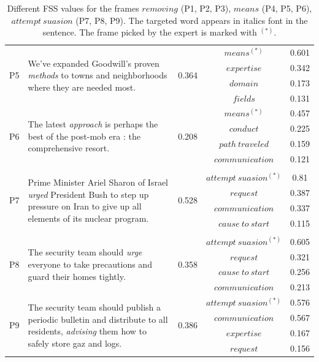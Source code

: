 \begin{table}[tb!]
{\begin{tabular}{cp{5.5cm}ccc}
\multirow{4}{*}{P5} & \multirow{4}{5.5cm}{We've expanded Goodwill's proven \textit{methods} to towns and neighborhoods where they are needed most.} & \multirow{4}{*}{0.364} & $means^{(*)}$ & 0.601 \\ %
& & & $expertise$ & 0.342 \\ %
& & & $domain$ & 0.173 \\ %
& & & $fields$ & 0.131 \\ \hline

\multirow{4}{*}{P6} & \multirow{4}{5.5cm}{The latest \textit{approach} is perhaps the best of the post-mob era : the comprehensive resort.} & \multirow{4}{*}{0.208} & $means^{(*)}$ & 0.457 \\ %
& & & $conduct$ & 0.225 \\ %
& & & $path\ traveled$ & 0.159 \\ %
& & & $communication$ & 0.121 \\ \toprule

\multirow{6}{*}{P7} & \multirow{6}{5.5cm}{Prime Minister Ariel Sharon of Israel \textit{urged} President Bush to step up pressure on Iran to give up all elements of its nuclear program.} & \multirow{6}{*}{0.528} & & \\
& & & $attempt\ suasion^{(*)}$ & 0.81 \\ %
& & & $request$ & 0.387 \\ %
& & & $communication$ & 0.337 \\ %
& & & $cause\ to\ start$ & 0.115 \\
& & & & \\ \hline

\multirow{4}{*}{P8} & \multirow{4}{5.5cm}{The security team should \textit{urge} everyone to take precautions and guard their homes tightly.} & \multirow{4}{*}{0.358} & $attempt\ suasion^{(*)}$ & 0.605 \\ %
& & & $request$ & 0.321 \\ %
& & & $cause\ to\ start$ & 0.256 \\ %
& & & $communication$ & 0.213 \\ \hline

\multirow{4}{*}{P9} & \multirow{4}{5.5cm}{The security team should publish a periodic bulletin and distribute to all residents, \textit{advising} them how to safely store gaz and logs.} & \multirow{4}{*}{0.386} & $attempt\ suasion^{(*)}$ & 0.576 \\ %
& & & $communication$ & 0.567 \\ %
& & & $expertise$ & 0.167 \\ %
& & & $request$ & 0.156 \\ %
\bottomrule
\end{tabular}
}
\caption{Different FSS values for the frames $removing$ (P1, P2, P3), $means$ (P4, P5, P6), $attempt\ suasion$ (P7, P8, P9). The targeted word appears in italics font in the sentence. The frame picked by the expert is marked with $^{(*)}$.}
\label{tab:fss_ex}
\end{table}

